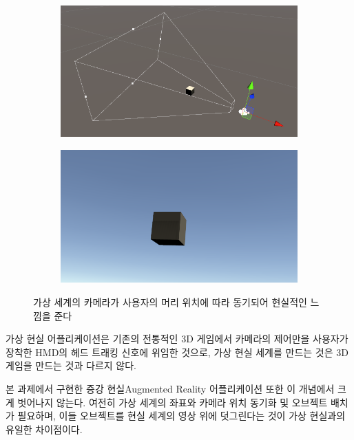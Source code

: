 \documentclass[10pt]{oblivoir}
\newcommand{\textss}[1]{\scriptsize#1\normalsize}
\begin{document}
\begin{figure}[ht]
    \begin{center}
        \begin{subfigure}{0.4\textwidth}
            \includegraphics[width=\textwidth]{img/vr-example-camera.png}
            \caption{}
        \end{subfigure}
        \begin{subfigure}{0.4\textwidth}
            \includegraphics[width=\textwidth]{img/vr-example-view.png}
            \caption{}
        \end{subfigure}
        \caption{가상 세계의 카메라가 사용자의 머리 위치에 따라 동기되어 현실적인 느낌을 준다}
    \end{center}
\end{figure}

가상 현실 어플리케이션은 기존의 전통적인 3D 게임에서 카메라의 제어만을 사용자가 장착한 HMD의 헤드 트래킹 신호에 위임한 것으로, 가상 현실 세계를 만드는 것은 3D 게임을 만드는 것과 다르지 않다.

본 과제에서 구현한 증강 현실\textss{Augmented Reality} 어플리케이션 또한 이 개념에서 크게 벗어나지 않는다. 여전히 가상 세계의 좌표와 카메라 위치 동기화 및 오브젝트 배치가 필요하며, 이들 오브젝트를 현실 세계의 영상 위에 덧그린다는 것이 가상 현실과의 유일한 차이점이다.
\end{document}
